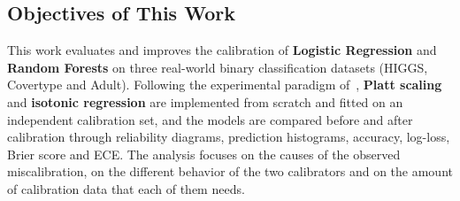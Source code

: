 \documentclass[a4paper, 10pt]{article}
\begin{document}
\subsection{Objectives of This Work}\label{sec:objectives}
This work evaluates and improves the calibration of \textbf{Logistic Regression} and \textbf{Random Forests} on three real-world binary classification datasets (HIGGS, Covertype and Adult). Following the experimental paradigm of~\cite{niculescu2005predicting}, \textbf{Platt scaling} and \textbf{isotonic regression} are implemented from scratch and fitted on an independent calibration set, and the models are compared before and after calibration through reliability diagrams, prediction histograms, accuracy, log-loss, Brier score and ECE. The analysis focuses on the causes of the observed miscalibration, on the different behavior of the two calibrators and on the amount of calibration data that each of them needs.
\end{document}
